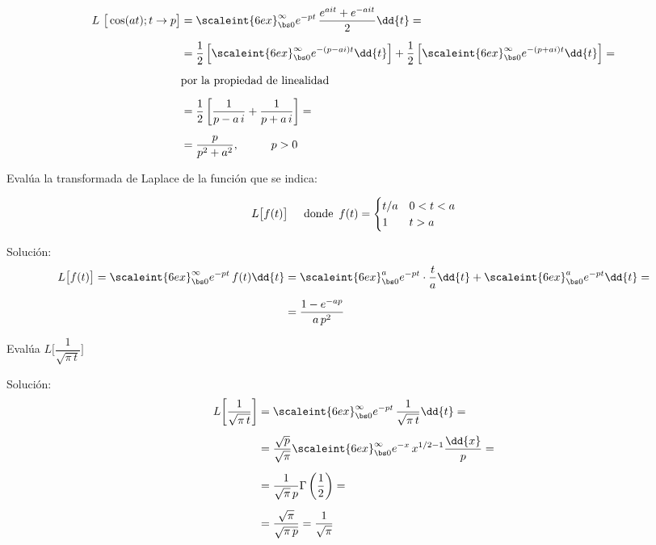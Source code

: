 \begin{ejemplo}
\begin{align*}
L \big[  \cos (a t); t \to p  \big] &= \scaleint{6ex}_{\bs 0}^{\infty} e^{-p t} \,\dfrac{e^{a i t} + e^{- a i t}}{2} \dd{t} = \\[0.5em]
&= \dfrac{1}{2} \left[ \scaleint{6ex}_{\bs 0}^{\infty} e^{-(p - a i) t} \dd{t} \right] + \dfrac{1}{2} \left[ \scaleint{6ex}_{\bs 0}^{\infty} e^{-(p + a i) t} \dd{t} \right] = \\[0.5em]
&\mbox{por la propiedad de linealidad  } \\[0.5em]
&= \dfrac{1}{2} \left[ \dfrac{1}{p - a \, i} + \dfrac{1}{p + a \, i}\right] = \\[0.5em]
&= \dfrac{p}{p^{2} + a^{2}}, \hspace{1cm} p > 0
\end{align*}
\end{ejemplo}
Evalúa la transformada de Laplace de la función que se indica:
\begin{ejemplo}
\begin{align*}
L \big[  f (t)  \big] \hspace{0.5cm} \mbox{donde} \hspace{0.5em} f (t) = \begin{cases}
t/a & 0 < t < a \\
1 & t > a
\end{cases}
\end{align*}

Solución:
\begin{align*}
L \big[  f (t)  \big] = \scaleint{6ex}_{\bs 0}^{\infty} e^{-p t} \, f (t) \dd{t}  &= \scaleint{6ex}_{\bs 0}^{a} e^{-p t} \cdot \dfrac{t}{a} \dd{t} + \scaleint{6ex}_{\bs 0}^{a} e^{-p t} \dd{t} = \\[0.5em]
&=\dfrac{1 - e^{- a p}}{a \, p^{2}}
\end{align*}
\end{ejemplo}
\begin{ejemplo}
Evalúa $L \bigg[\dfrac{1}{\sqrt{\pi \, t}}\bigg]$

Solución:
\begin{align*}
L \bigg[ \dfrac{1}{\sqrt{\pi \, t}} \bigg] &= \scaleint{6ex}_{\bs 0}^{\infty} e^{- p t} \, \dfrac{1}{\sqrt{\pi \, t}} \dd{t} = \\[0.5em]
&= \dfrac{\sqrt{p}}{\sqrt{\pi}} \scaleint{6ex}_{\bs 0}^{\infty} e^{-x} \, x^{1/2 - 1} \dfrac{\dd{x}}{p} = \\[0.5em]
&= \dfrac{1}{\sqrt{\pi} \, p} \Gamma \left( \dfrac{1}{2} \right) = \\[0.5em]
&= \dfrac{\sqrt{\pi}}{\sqrt{\pi \, p}} = \dfrac{1}{\sqrt{\pi}}
\end{align*}
\end{ejemplo}
